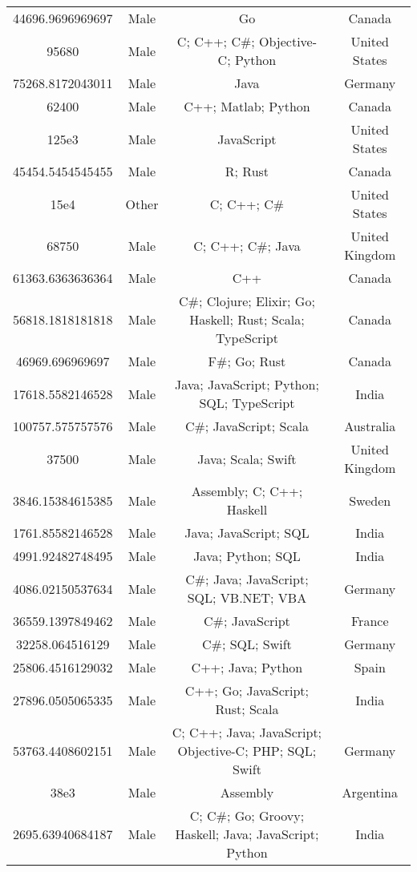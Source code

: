 \begin{center}
\begin{tabular}{ |c|c|c|c| }
44696.9696969697  &  Male  &  Go  &  Canada  \\ 
95680  &  Male  &  C; C++; C\#; Objective-C; Python  &  United States  \\ 
75268.8172043011  &  Male  &  Java  &  Germany  \\ 
62400  &  Male  &  C++; Matlab; Python  &  Canada  \\ 
125e3  &  Male  &  JavaScript  &  United States  \\ 
45454.5454545455  &  Male  &  R; Rust  &  Canada  \\ 
15e4  &  Other  &  C; C++; C\#  &  United States  \\ 
68750  &  Male  &  C; C++; C\#; Java  &  United Kingdom  \\ 
61363.6363636364  &  Male  &  C++  &  Canada  \\ 
56818.1818181818  &  Male  &  C\#; Clojure; Elixir; Go; Haskell; Rust; Scala; TypeScript  &  Canada  \\ 
46969.696969697  &  Male  &  F\#; Go; Rust  &  Canada  \\ 
17618.5582146528  &  Male  &  Java; JavaScript; Python; SQL; TypeScript  &  India  \\ 
100757.575757576  &  Male  &  C\#; JavaScript; Scala  &  Australia  \\ 
37500  &  Male  &  Java; Scala; Swift  &  United Kingdom  \\ 
3846.15384615385  &  Male  &  Assembly; C; C++; Haskell  &  Sweden  \\ 
1761.85582146528  &  Male  &  Java; JavaScript; SQL  &  India  \\ 
4991.92482748495  &  Male  &  Java; Python; SQL  &  India  \\ 
4086.02150537634  &  Male  &  C\#; Java; JavaScript; SQL; VB.NET; VBA  &  Germany  \\ 
36559.1397849462  &  Male  &  C\#; JavaScript  &  France  \\ 
32258.064516129  &  Male  &  C\#; SQL; Swift  &  Germany  \\ 
25806.4516129032  &  Male  &  C++; Java; Python  &  Spain  \\ 
27896.0505065335  &  Male  &  C++; Go; JavaScript; Rust; Scala  &  India  \\ 
53763.4408602151  &  Male  &  C; C++; Java; JavaScript; Objective-C; PHP; SQL; Swift  &  Germany  \\ 
38e3  &  Male  &  Assembly  &  Argentina  \\ 
2695.63940684187  &  Male  &  C; C\#; Go; Groovy; Haskell; Java; JavaScript; Python  &  India  \\ 

\end{tabular}
\end{center}
